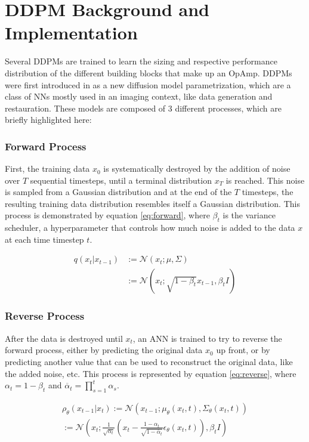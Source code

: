 \documentclass[conference]{IEEEtran}
\begin{document}
\section{DDPM Background and Implementation}\label{sec:ddpm}
	Several DDPMs are trained to learn the sizing and respective performance distribution of the different building blocks that make up an OpAmp. DDPMs were first introduced in \cite{ho2020denoisingdiffusionprobabilisticmodels} as a new diffusion model parametrization, which are a class of NNs mostly used in an imaging context, like data generation and restauration. These models are composed of 3 different processes, which are briefly highlighted here:
	
	\subsubsection{Forward Process}
	First, the training data $x_{0}$ is systematically destroyed by the addition of noise over $T$ sequential timesteps, until a terminal distribution $x_{T}$ is reached. This noise is sampled from a Gaussian distribution and at the end of the $T$ timesteps, the resulting training data distribution resembles itself a Gaussian distribution. This process is demonstrated by equation \ref{eq:forward}, where $\beta_{t}$ is the variance scheduler, a hyperparameter that controls how much noise is added to the data $x$ at each time timestep $t$.
	
	\begin{equation} \label{eq:forward}
	\begin{aligned}
	q(x_{t}|x_{t-1}) &:= \mathcal{N}(x_{t};\mu,\Sigma) \\ &:= \mathcal{N}(x_{t};\sqrt{1-\beta_{t}}x_{t-1}, \beta_{t}I)
	\end{aligned}
	\end{equation}
	
	\subsubsection{Reverse Process}
	After the data is destroyed until $x_{t}$, an ANN is trained to try to reverse the forward process, either by predicting the original data $x_{0}$ up front, or by predicting another value that can be used to reconstruct the original data, like the added noise, etc. This process is represented by equation \ref{eq:reverse}, where $\alpha_{t}=1-\beta_{t}$ and $\overline{\alpha}_{t}=\prod_{s=1}^{t}\alpha_{s}$.
	
	\begin{equation} \label{eq:reverse}
	\begin{split}
		\rho_{\theta}(x_{t-1}|x_{t}) := \mathcal{N}(x_{t-1};\mu_{\theta}(x_{t},t),\Sigma_{\theta}(x_{t},t)) \\:= \mathcal{N}(x_{t};\frac{1}{\sqrt{\alpha_{t}}}(x_{t}-\frac{1-\alpha_{t}}{\sqrt{1-\overline{\alpha}_{t}}}\epsilon_{\theta}(x_{t},t)),\beta_{t}I) 
	\end{split}
	\end{equation}
	
\end{document}
